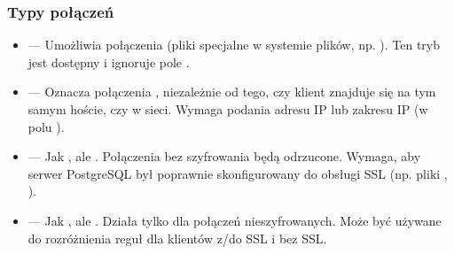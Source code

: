 \documentclass[letterpaper,10pt,polish]{sphinxmanual}
\begin{document}
\subsubsection{Typy połączeń}
\label{\detokenize{rozdzial2/bezpieczenstwo/index:typy-polaczen}}\begin{itemize}
\item {} 
\sphinxAtStartPar
{} — Umożliwia połączenia  (pliki specjalne w systemie plików, np. ).
Ten tryb jest dostępny  i ignoruje pole .

\item {} 
\sphinxAtStartPar
{} — Oznacza połączenia , niezależnie od tego, czy klient znajduje się na tym samym hoście, czy w sieci.
Wymaga podania adresu IP lub zakresu IP (w polu ).

\item {} 
\sphinxAtStartPar
{} — Jak , ale . Połączenia bez szyfrowania będą odrzucone.
Wymaga, aby serwer PostgreSQL był poprawnie skonfigurowany do obsługi SSL (np. pliki , ).

\item {} 
\sphinxAtStartPar
{} — Jak , ale . Działa tylko dla połączeń nieszyfrowanych.
Może być używane do rozróżnienia reguł dla klientów z/do SSL i bez SSL.

\end{itemize}
\end{document}
